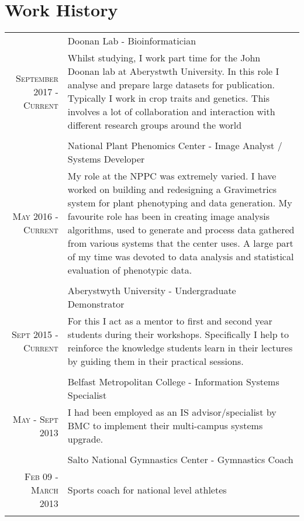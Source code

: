 \documentclass[a4paper,9pt]{article}
\begin{document}
\section{Work History}
\begin{longtable}{r|p{11cm}}

  &Doonan Lab - Bioinformatician \\\textsc{September 2017 - Current}
  &\footnotesize{Whilst studying, I work part time for the John Doonan lab at Aberystwth University. In this role I analyse and prepare large datasets for publication. Typically I work in crop traits and genetics. This involves a lot of collaboration and interaction with different research groups around the world}\\\multicolumn{2}{c}{} \\

  &National Plant Phenomics Center - Image Analyst / Systems Developer \\\textsc{May 2016 - Current}
  &\footnotesize{
    My role at the NPPC was extremely varied. I have worked on building and redesigning a Gravimetrics system for plant phenotyping and data generation. 
    My favourite role has been in creating image analysis algorithms, used to generate and process data gathered from various systems that the center uses.
    A large part of my time was devoted to data analysis and statistical evaluation of phenotypic data.}\\\multicolumn{2}{c}{} \\
  
  
  &Aberystwyth University - Undergraduate Demonstrator \\ \textsc{Sept 2015 - Current}
  &\footnotesize{For this I act as a mentor to first and second year students during their workshops. Specifically I help to reinforce the knowledge students learn in their lectures by guiding them in their practical sessions.}\\\multicolumn{2}{c}{} \\

  &Belfast Metropolitan College - Information Systems Specialist \\\textsc{May - Sept 2013}
  &\footnotesize{I had been employed as an IS advisor/specialist by BMC to implement their multi-campus systems upgrade.}\\\multicolumn{2}{c}{} \\

  &Salto National Gymnastics Center - Gymnastics Coach \\\textsc{Feb 09 - March 2013}
   & \footnotesize{Sports coach for national level athletes}\\\multicolumn{2}{c}{} \\
\end{longtable}
\end{document}
